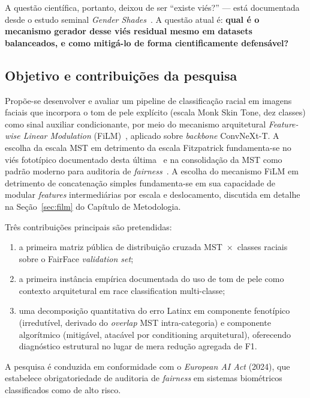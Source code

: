 A questão científica, portanto, deixou de ser ``existe viés?'' --- está documentada desde o estudo seminal \emph{Gender Shades}~\autocite{buolamwini2018gender}. A questão atual é: \textbf{qual é o mecanismo gerador desse viés residual mesmo em datasets balanceados, e como mitigá-lo de forma cientificamente defensável?}

\subsection{Objetivo e contribuições da pesquisa}
\label{sec:intro_objetivo}

Propõe-se desenvolver e avaliar um pipeline de classificação racial em imagens faciais que incorpora o tom de pele explícito (escala Monk Skin Tone, dez classes) como sinal auxiliar condicionante, por meio do mecanismo arquitetural \emph{Feature-wise Linear Modulation} (FiLM)~\autocite{perez2018film}, aplicado sobre \emph{backbone} ConvNeXt-T. A escolha da escala MST em detrimento da escala Fitzpatrick fundamenta-se no viés fototípico documentado desta última~\autocite{fitzpatrick1988validity} e na consolidação da MST como padrão moderno para auditoria de \emph{fairness}~\autocite{schumann2023consensus,matias2026large}. A escolha do mecanismo FiLM em detrimento de concatenação simples fundamenta-se em sua capacidade de modular \emph{features} intermediárias por escala e deslocamento, discutida em detalhe na Seção~\ref{sec:film} do Capítulo de Metodologia.

Três contribuições principais são pretendidas:

\begin{enumerate}[label=(\roman*)]
\item a primeira matriz pública de distribuição cruzada MST~$\times$~classes raciais sobre o FairFace \emph{validation set};
\item a primeira instância empírica documentada do uso de tom de pele como contexto arquitetural em race classification multi-classe;
\item uma decomposição quantitativa do erro Latinx em componente fenotípico (irredutível, derivado do \emph{overlap} MST intra-categoria) e componente algorítmico (mitigável, atacável por conditioning arquitetural), oferecendo diagnóstico estrutural no lugar de mera redução agregada de F1.
\end{enumerate}

A pesquisa é conduzida em conformidade com o \emph{European AI Act} (2024), que estabelece obrigatoriedade de auditoria de \emph{fairness} em sistemas biométricos classificados como de alto risco.

